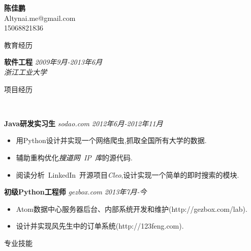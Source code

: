 ﻿\documentclass[9pt]{article}
\newenvironment{changemargin}[2]{%
  \begin{list}{}{%
    \setlength{\topsep}{0pt}%
    \setlength{\leftmargin}{#1}%
    \setlength{\rightmargin}{#2}%
    \setlength{\listparindent}{\parindent}%
    \setlength{\itemindent}{\parindent}%
    \setlength{\parsep}{\parskip}%
  }%
  \item[]}{\end{list}
}
\newcommand{\lineover}{
	\begin{changemargin}{-0.05in}{-0.05in}
		\vspace*{-8pt}
		\hrulefill \\
		\vspace*{-2pt}
	\end{changemargin}
}
\newcommand{\header}[1]{
	\begin{changemargin}{-0.5in}{-0.5in}
		\scshape{#1}\\
  	\lineover
	\end{changemargin}
}
\newcommand{\contact}[4]{
	\begin{changemargin}{-0.5in}{-0.5in}
		\begin{center}
			{\Large \scshape \textbf{#1}}\\ \smallskip
			{#2}\\ \smallskip
			{#3}\\ \smallskip
			{#4}\smallskip
		\end{center}
	\end{changemargin}
}
\newenvironment{body} {
	\vspace*{-16pt}
	\begin{changemargin}{-0.25in}{-0.5in}
  }	
	{\end{changemargin}
}
\begin{document}
\contact{陈佳鹏}{Altynai.me@gmail.com}{15068821836}

\header{教育经历}
\begin{body}
	\vspace{14pt}
	\textbf{软件工程} \hfill \emph{2009年9月-2013年6月} \\
	\emph{浙江工业大学}\\
\end{body}

\smallskip

\header{项目经历}

\begin{body}
	\vspace{14pt}

	\textbf{Java研发实习生} \emph{sodao.com} \hfill \emph{2012年6月-2012年11月}\\
	\vspace*{-4pt}
	\begin{itemize} \itemsep -0pt  %
		\item 用Python设计并实现一个网络爬虫,抓取全国所有大学的数据.
        \item 辅助重构优化\emph{搜道网~IP~库}的源代码.
        \item 阅读分析~LinkedIn~开源项目\emph{Cleo},设计实现一个简单的即时搜索的模块.
	\end{itemize}

    \textbf{初级Python工程师} \emph{gezbox.com} \hfill \emph{2013年7月-今}\\
    \vspace*{-4pt}
    \begin{itemize} \itemsep -0pt  %
        \item Atom数据中心服务器后台、内部系统开发和维护(http://gezbox.com/lab).
        \item 设计并实现风先生中的订单系统(http://123feng.com).
    \end{itemize}

\end{body}

\smallskip


\header{专业技能}
\end{document}
